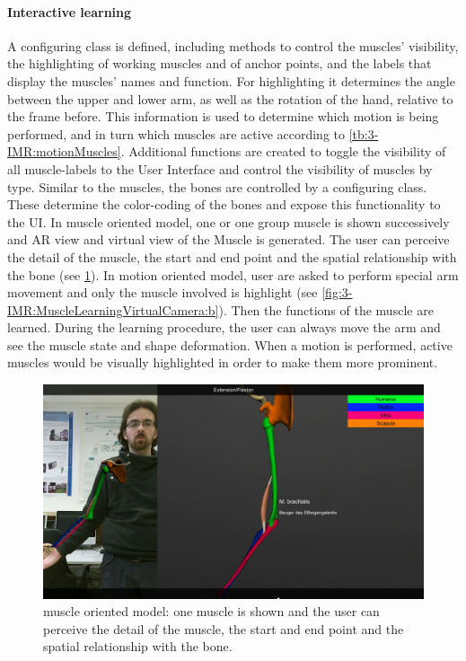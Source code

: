 \paragraph{Interactive learning}
A configuring class is defined, including methods to control the muscles' visibility, the highlighting of working muscles and of anchor points, and the labels that display the muscles' names and function. For highlighting it determines the angle between the upper and lower arm, as well as the rotation of the hand, relative to the frame before. This information is used to determine which motion is being performed, and in turn which muscles are active according to \tablename{\ref{tb:3-IMR:motionMuscles}}. 
Additional functions are created to toggle the visibility of all muscle-labels to the User Interface and control the visibility of muscles by type.
Similar to the muscles, the bones are controlled by a configuring class. These determine the color-coding of the bones and expose this functionality to the UI.
In muscle oriented model, one or one group muscle is shown successively and AR view and virtual view of the Muscle is generated. The user can perceive the detail of the muscle, the start and end point and the spatial relationship with the bone (see \figurename{\ref{fig:3-IMR:muscleModelLearning}}). In motion oriented model, user are asked to perform special arm movement and only the muscle involved is highlight (see \figurename{\ref{fig:3-IMR:MuscleLearningVirtualCamera:b}}). Then the functions of the muscle are learned. 
During the learning procedure, the user can always move the arm and see the muscle state and shape deformation.
When a motion is performed, active muscles would be visually highlighted in order to make them more prominent.
\begin{figure}
\centering
\includegraphics[width=0.8\linewidth]{figures/3-IMR/muscleModel}
\caption{muscle oriented model: one muscle is shown and the user can perceive the detail of the muscle, the start and end point and the spatial relationship with the bone.}
\label{fig:3-IMR:muscleModelLearning}
\end{figure}

